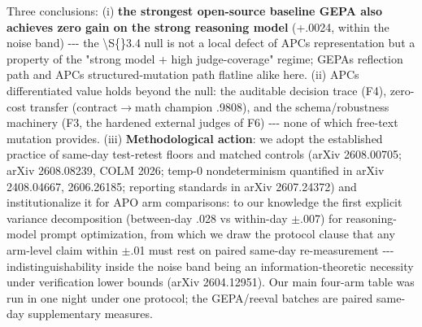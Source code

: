 Three conclusions: (i) \textbf{the strongest open-source baseline GEPA also achieves zero gain on the strong reasoning model} (+.0024, within the noise band) -\/-\/- the \textbackslash S\{\}3.4 null is not a local defect of APC\textquotesingle s representation but a property of the "strong model + high judge-coverage" regime; GEPA\textquotesingle s reflection path and APC\textquotesingle s structured-mutation path flatline alike here. (ii) APC\textquotesingle s differentiated value holds beyond the null: the auditable decision trace (F4), zero-cost transfer (contract\(\rightarrow\)math champion .9808), and the schema/robustness machinery (F3, the hardened external judges of F6) -\/-\/- none of which free-text mutation provides. (iii) \textbf{Methodological action}: we adopt the established practice of same-day test-retest floors and matched controls (arXiv 2608.00705; arXiv 2608.08239, COLM 2026; temp-0 nondeterminism quantified in arXiv 2408.04667, 2606.26185; reporting standards in arXiv 2607.24372) and institutionalize it for APO arm comparisons: to our knowledge the first explicit variance decomposition (between-day .028 vs within-day \(\pm\).007) for reasoning-model prompt optimization, from which we draw the protocol clause that any arm-level claim within \(\pm\).01 must rest on paired same-day re-measurement -\/-\/- indistinguishability inside the noise band being an information-theoretic necessity under verification lower bounds (arXiv 2604.12951). Our main four-arm table was run in one night under one protocol; the GEPA/reeval batches are paired same-day supplementary measures.

